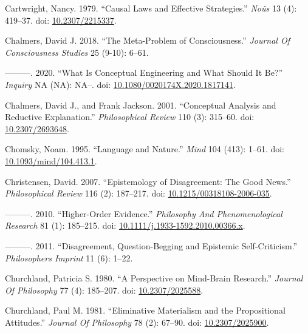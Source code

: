 \documentclass[
  10pt,
  letterpaper,
  DIV=11,
  numbers=noendperiod,
  twoside]{scrartcl}
\newlength{\cslhangindent}
\newenvironment{CSLReferences}[2] %
 {\begin{list}{}{%
  \setlength{\itemindent}{0pt}
  \setlength{\leftmargin}{0pt}
  \setlength{\parsep}{0pt}
  \ifodd #1
   \setlength{\leftmargin}{\cslhangindent}
   \setlength{\itemindent}{-1\cslhangindent}
  \fi
  \setlength{\itemsep}{#2\baselineskip}}}
 {\end{list}}
\begin{document}
\begin{CSLReferences}{1}{0}
Cartwright, Nancy. 1979. {``Causal Laws and Effective Strategies.''}
\emph{Noûs} 13 (4): 419--37. doi:
\href{https://doi.org/10.2307/2215337}{10.2307/2215337}.

Chalmers, David J. 2018. {``The Meta-Problem of Consciousness.''}
\emph{Journal Of Consciousness Studies} 25 (9-10): 6--61.

---------. 2020. {``What Is Conceptual Engineering and What Should It
Be?''} \emph{Inquiry} NA (NA): NA--. doi:
\href{https://doi.org/10.1080/0020174X.2020.1817141}{10.1080/0020174X.2020.1817141}.

Chalmers, David J., and Frank Jackson. 2001. {``Conceptual Analysis and
Reductive Explanation.''} \emph{Philosophical Review} 110 (3): 315--60.
doi: \href{https://doi.org/10.2307/2693648}{10.2307/2693648}.

Chomsky, Noam. 1995. {``Language and Nature.''} \emph{Mind} 104 (413):
1--61. doi:
\href{https://doi.org/10.1093/mind/104.413.1}{10.1093/mind/104.413.1}.

Christensen, David. 2007. {``Epistemology of Disagreement: The Good
News.''} \emph{Philosophical Review} 116 (2): 187--217. doi:
\href{https://doi.org/10.1215/00318108-2006-035}{10.1215/00318108-2006-035}.

---------. 2010. {``Higher-Order Evidence.''} \emph{Philosophy And
Phenomenological Research} 81 (1): 185--215. doi:
\href{https://doi.org/10.1111/j.1933-1592.2010.00366.x}{10.1111/j.1933-1592.2010.00366.x}.

---------. 2011. {``Disagreement, Question-Begging and Epistemic
Self-Criticism.''} \emph{Philosophers Imprint} 11 (6): 1--22.

Churchland, Patricia S. 1980. {``A Perspective on Mind-Brain
Research.''} \emph{Journal Of Philosophy} 77 (4): 185--207. doi:
\href{https://doi.org/10.2307/2025588}{10.2307/2025588}.

Churchland, Paul M. 1981. {``Eliminative Materialism and the
Propositional Attitudes.''} \emph{Journal Of Philosophy} 78 (2): 67--90.
doi: \href{https://doi.org/10.2307/2025900}{10.2307/2025900}.


\end{CSLReferences}
\end{document}
